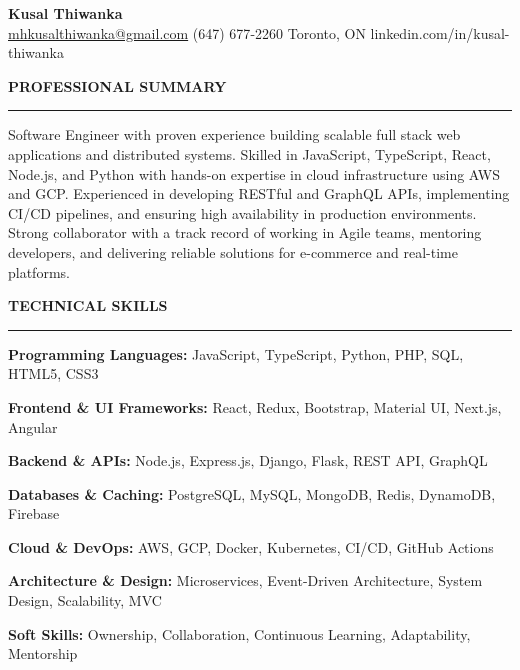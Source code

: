 \documentclass[10pt,letterpaper]{article}
\begin{document}
\begin{center}
{\LARGE\textbf{Kusal Thiwanka}}\\[3pt]
\href{mailto:mhkusalthiwanka@gmail.com}{mhkusalthiwanka@gmail.com}\hspace{2em}%
(647) 677{-}2260\hspace{2em}%
Toronto, ON\hspace{2em}
linkedin.com/in/kusal-thiwanka
\end{center}

\vspace{6pt}

\textbf{PROFESSIONAL SUMMARY}\\[-8pt]
\noindent\rule{\textwidth}{1pt}

\vspace{-2pt}

Software Engineer with proven experience building scalable full stack web applications and distributed systems. Skilled in JavaScript, TypeScript, React, Node.js, and Python with hands-on expertise in cloud infrastructure using AWS and GCP. Experienced in developing RESTful and GraphQL APIs, implementing CI/CD pipelines, and ensuring high availability in production environments. Strong collaborator with a track record of working in Agile teams, mentoring developers, and delivering reliable solutions for e-commerce and real-time platforms.

\vspace{8pt}

\textbf{TECHNICAL SKILLS}\\[-8pt]
\noindent\rule{\textwidth}{1pt}

\vspace{-2pt}

\textbf{Programming Languages:} JavaScript, TypeScript, Python, PHP, SQL, HTML5, CSS3

\textbf{Frontend \& UI Frameworks:} React, Redux, Bootstrap, Material UI, Next.js, Angular

\textbf{Backend \& APIs:} Node.js, Express.js, Django, Flask, REST API, GraphQL

\textbf{Databases \& Caching:} PostgreSQL, MySQL, MongoDB, Redis, DynamoDB, Firebase

\textbf{Cloud \& DevOps:} AWS, GCP, Docker, Kubernetes, CI/CD, GitHub Actions

\textbf{Architecture \& Design:} Microservices, Event-Driven Architecture, System Design, Scalability, MVC

\textbf{Soft Skills:} Ownership, Collaboration, Continuous Learning, Adaptability, Mentorship
\end{document}
